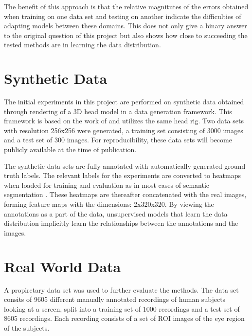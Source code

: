 The benefit of this approach is that the relative magnitutes of the errors obtained when training on one data set and testing on another indicate the difficulties of adapting models between these domains. This does not only give a binary answer to the original question of this project but also shows how close to succeeding the tested methods are in learning the data distribution. %


\section{Synthetic Data}
The initial experiments in this project are performed on synthetic data obtained through rendering of a 3D head model in a data generation framework. This framework is based on the work of \textcite{swirski2014rendering} and utilizes the same head rig. Two data sets with resolution 256x256 were generated, a training set consisting of 3000 images and a test set of 300 images. For reproducibility, these data sets will become publicly available at the time of publication.

The synthetic data sets are fully annotated with automatically generated ground truth labels. The relevant labels for the experiments are converted to heatmaps when loaded for training and evaluation as in most cases of semantic segmentation \parencite{guo2017review}. These heatmaps are thereafter concatenated with the real images, forming feature maps with the dimensions: 2x320x320. By viewing the annotations as a part of the data, unsupervised models that learn the data distribution implicitly learn the relationships between the annotations and the images.

\section{Real World Data}
A propiretary data set was used to further evaluate the methods. The data set consits of 9605 different manually annotated recordings of human subjects looking at a screen, split into a training set of 1000 recordings and a test set of 8605 recordings. Each recording consists of a set of ROI  images of the eye region of the subjects. 

